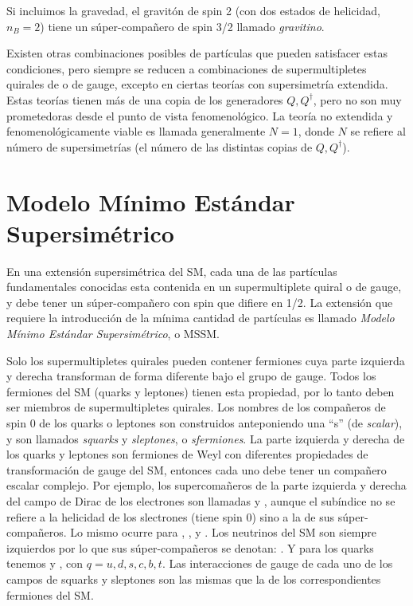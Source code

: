 Si incluimos la gravedad, el gravitón de spin 2 (con dos estados de
helicidad, $n_B=2$) tiene un súper-compañero de spin 3/2 llamado
\emph{gravitino}.

Existen otras combinaciones posibles de partículas que pueden
satisfacer estas condiciones, pero siempre se reducen a combinaciones
de supermultipletes quirales de o de gauge, excepto en ciertas teorías
con supersimetría extendida. Estas teorías tienen más de una copia de
los generadores $Q, Q^\dagger$, pero no son muy prometedoras desde el
punto de vista fenomenológico. La teoría no extendida y
fenomenológicamente viable es llamada generalmente $N=1$, donde $N$ se
refiere al número de supersimetrías (el número de las distintas copias
de $Q,Q^\dagger$).


\section{Modelo Mínimo Estándar Supersimétrico}

En una extensión supersimétrica del SM, cada una de las partículas
fundamentales conocidas esta contenida en un supermultiplete quiral o
de gauge, y debe tener un súper-compa\~nero con spin que difiere en
1/2. La extensión que requiere la introducción de la mínima cantidad
de partículas es llamado \emph{Modelo Mínimo Estándar Supersimétrico},
o MSSM.


Solo los supermultipletes quirales pueden contener fermiones cuya
parte izquierda y derecha transforman de forma diferente bajo el grupo
de gauge. Todos los fermiones del SM (quarks y leptones) tienen esta
propiedad, por lo tanto deben ser miembros de supermultipletes
quirales. Los nombres de los compañeros de spin 0 de los quarks o
leptones son construidos anteponiendo una ``s'' (de \emph{scalar}), y
son llamados \emph{squarks} y \emph{sleptones}, o \emph{sfermiones}.
La parte izquierda y derecha de los quarks y leptones son fermiones de
Weyl con diferentes propiedades de transformación de gauge del SM,
entonces cada uno debe tener un compañero escalar complejo. Por
ejemplo, los supercomañeros de la parte izquierda y derecha del campo
de Dirac de los electrones son llamadas {\selL} y {\selR}, aunque el
subíndice no se refiere a la helicidad de los slectrones (tiene spin
0) sino a la de sus súper-compañeros. Lo mismo ocurre para {\smuL},
{\smuR}, {\stauL} y {\stauR}. Los neutrinos del SM son siempre
izquierdos por lo que sus súper-compañeros se denotan: {\snu}. Y para
los quarks tenemos {\squarkL} y {\squarkR}, con $q = u, d, s, c, b,
t$. Las interacciones de gauge de cada uno de los campos de squarks y
sleptones son las mismas que la de los correspondientes fermiones del
SM.

